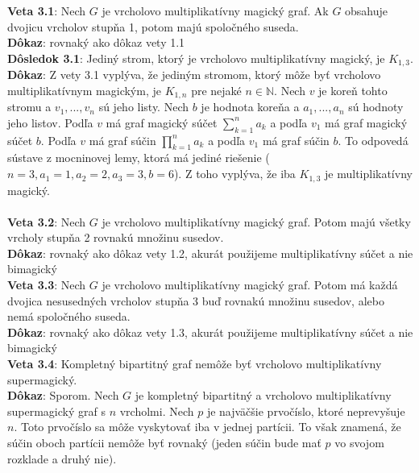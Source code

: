 \documentclass[12pt]{article}
\begin{document}
\textbf{Veta 3.1}: Nech $G$ je vrcholovo multiplikatívny magický graf. Ak $G$ obsahuje dvojicu vrcholov stupňa 1, potom majú spoločného suseda. \\

\textbf{Dôkaz}: rovnaký ako dôkaz vety 1.1 \\

\textbf{Dôsledok 3.1}: Jediný strom, ktorý je vrcholovo multiplikatívny magický, je $K_{1,3}$. \\

\textbf{Dôkaz}: Z vety 3.1 vyplýva, že jediným stromom, ktorý môže byť vrcholovo multiplikatívnym magickým, je $K_{1,n}$ pre nejaké $n \in \mathbb{N}$. Nech $v$ je koreň tohto stromu a $v_1, ... , v_n$ sú jeho listy. Nech $b$ je hodnota koreňa a $a_1, ... , a_n$ sú hodnoty jeho listov. Podľa $v$ má graf magický súčet $\sum_{k=1}^{n} a_k$ a podľa $v_1$ má graf magický súčet $b$. Podľa $v$ má graf súčin $\prod_{k=1}^{n} a_k$ a podľa $v_1$ má graf súčin $b$. To odpovedá sústave z mocninovej lemy, ktorá má jediné riešenie ($n = 3, a_1 = 1, a_2 = 2, a_3 = 3, b = 6$). Z toho vyplýva, že iba $K_{1,3}$ je multiplikatívny magický. \\\\

\textbf{Veta 3.2}: Nech $G$ je vrcholovo multiplikatívny magický graf. Potom majú všetky vrcholy stupňa 2 rovnakú množinu susedov. \\

\textbf{Dôkaz}: rovnaký ako dôkaz vety 1.2, akurát použijeme multiplikatívny súčet a nie bimagický \\

\textbf{Veta 3.3}: Nech $G$ je vrcholovo multiplikatívny magický graf. Potom má každá dvojica nesusedných vrcholov stupňa 3 buď rovnakú množinu susedov, alebo nemá spoločného suseda.  \\

\textbf{Dôkaz}: rovnaký ako dôkaz vety 1.3, akurát použijeme multiplikatívny súčet a nie bimagický \\

\textbf{Veta 3.4}: Kompletný bipartitný graf nemôže byť vrcholovo multiplikatívny supermagický. \\

\textbf{Dôkaz}: Sporom. Nech $G$ je kompletný bipartitný a vrcholovo multiplikatívny supermagický graf s $n$ vrcholmi. Nech $p$ je najväčšie prvočíslo, ktoré neprevyšuje $n$. Toto prvočíslo sa môže vyskytovať iba v jednej partícii. To však znamená, že súčin oboch partícii nemôže byť rovnaký (jeden súčin bude mať $p$ vo svojom rozklade a druhý nie). \\\\
\end{document}
